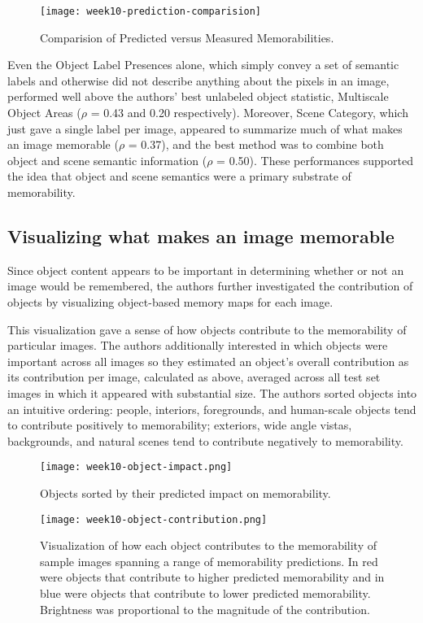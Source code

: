 \begin{figure}[!ht]
\centering
\texttt{[image: week10-prediction-comparision]}
\caption{Comparision of Predicted versus Measured Memorabilities.}
\end{figure}

Even the Object Label Presences alone, which simply convey a set of semantic labels and otherwise did not describe anything about the pixels in an image, performed well above the authors' best unlabeled object statistic, Multiscale Object Areas ($\rho$ = 0.43 and 0.20 respectively). Moreover, Scene Category, which just gave a single label per image, appeared to summarize much of what makes an image memorable ($\rho$ = 0.37), and the best method was to combine both object and scene semantic information ($\rho$ = 0.50). These performances supported the idea that object and scene semantics were a primary substrate of memorability.

\subsection{Visualizing what makes an image memorable}
Since object content appears to be important in determining whether or not an image would be remembered, the authors further investigated the contribution of objects by visualizing object-based memory maps for each image.

This visualization gave a sense of how objects contribute
to the memorability of particular images. The authors additionally interested in which objects were important across all images so they estimated an object’s overall contribution as its contribution per image, calculated as above, averaged across all test set images in which it appeared with substantial size. The authors sorted objects into an intuitive ordering: people, interiors, foregrounds, and human-scale objects tend to contribute positively to memorability; exteriors, wide angle vistas, backgrounds, and natural scenes tend to contribute negatively to memorability.

\begin{figure}[!ht]
\centering
\texttt{[image: week10-object-impact.png]}
\caption{Objects sorted by their predicted impact on memorability.}
\end{figure}

\newpage
\begin{figure}[!ht]
\centering
\texttt{[image: week10-object-contribution.png]}
\caption{Visualization of how each object contributes to the memorability of sample images spanning a range of memorability predictions. In red were objects that contribute to higher predicted memorability and in blue were objects that contribute to lower predicted memorability. Brightness was proportional to the magnitude of the contribution.}
\end{figure}